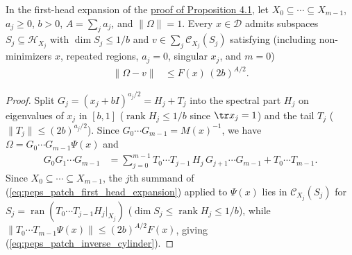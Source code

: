 \begin{lemma}
    \label{thm:peps_patch_inverse_cylinder}
    \leanok
    In the first-head expansion of the
    \href{https://github.com/openai/math/blob/adc7f1241b42e322a6451854ab7e4b4c146bf78a/preprints/Polynomial-PEPS-approximation-of-gapped-square-grid-ground-states-September-24-2026/build/sections/03-patches.tex\#L484-L532}{proof of Proposition 4.1},
    let $X_0\subseteq\cdots\subseteq X_{m-1}$, $a_j\ge0$, $b>0$, $A=\sum_ja_j$,
    and $\|\Omega\|=1$. Every $x\in\mathcal D$ admits subspaces
    $S_j\subseteq\mathcal H_{X_j}$ with $\dim S_j\le1/b$ and
    $v\in\sum_j\mathcal C_{X_j}(S_j)$ satisfying (including non-minimizers $x$,
    repeated regions, $a_j=0$, singular $x_j$, and $m=0$)
    \begin{align}
        \|\Omega-v\| & \le F(x)\,(2b)^{A/2}.
        \label{eq:peps_patch_inverse_cylinder}
    \end{align}
\end{lemma}
\begin{proof}
    \leanok
    Split $G_j=(x_j+bI)^{a_j/2}=H_j+T_j$ into the spectral part $H_j$ on
    eigenvalues of $x_j$ in $[b,1]$ ($\operatorname{rank}H_j\le1/b$ since
    $\tr x_j=1$) and the tail $T_j$ ($\|T_j\|\le(2b)^{a_j/2}$). Since
    $G_0\cdots G_{m-1}=M(x)^{-1}$, we have $\Omega=G_0\cdots G_{m-1}\Psi(x)$ and
    \begin{align}
        G_0G_1\cdots G_{m-1}
         & =\sum_{j=0}^{m-1}T_0\cdots T_{j-1}\,H_j\,G_{j+1}\cdots G_{m-1}
        +T_0\cdots T_{m-1}.
        \label{eq:peps_patch_first_head_expansion}
    \end{align}
    Since $X_0\subseteq\cdots\subseteq X_{m-1}$, the $j$th summand of
    (\ref{eq:peps_patch_first_head_expansion}) applied to $\Psi(x)$ lies in
    $\mathcal C_{X_j}(S_j)$ for $S_j=\operatorname{ran}(T_0\cdots T_{j-1}H_j|_{X_j})$
    ($\dim S_j\le\operatorname{rank}H_j\le1/b$), while
    $\|T_0\cdots T_{m-1}\Psi(x)\|\le(2b)^{A/2}F(x)$, giving
    (\ref{eq:peps_patch_inverse_cylinder}).
\end{proof}
